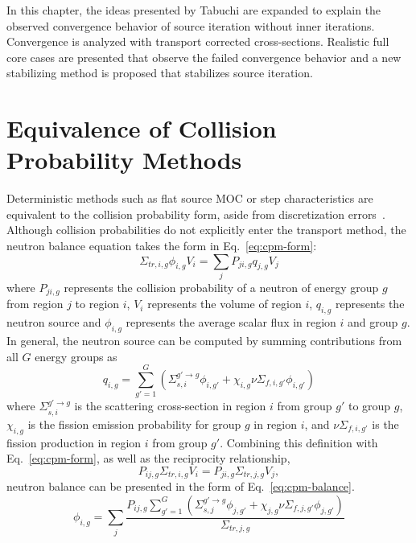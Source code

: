 In this chapter, the ideas presented by Tabuchi are expanded to explain the observed convergence behavior of source iteration without inner iterations. Convergence is analyzed with transport corrected cross-sections. Realistic full core cases are presented that observe the failed convergence behavior and a new stabilizing method is proposed that stabilizes source iteration.

\section{Equivalence of Collision Probability Methods}
\label{sec:equiv-cpm}

Deterministic methods such as flat source \ac{MOC} or step characteristics are equivalent to the collision probability form, aside from discretization errors~\cite{ty-problem}. Although collision probabilities do not explicitly enter the transport method, the neutron balance equation takes the form in Eq.~\ref{eq:cpm-form}:
\begin{equation}
	\Sigma_{\textit{tr}, i, g} \phi_{i,g} V_i = \sum_j P_{ji, g} q_{j,g} V_j
	\label{eq:cpm-form}
\end{equation}
where $P_{ji,g}$ represents the collision probability of a neutron of energy group $g$ from region $j$ to region $i$, $V_i$ represents the volume of region $i$, $q_{i,g}$ represents the neutron source and $\phi_{i,g}$ represents the average scalar flux in region $i$ and group $g$. In general, the neutron source can be computed by summing contributions from all $G$ energy groups as
\begin{equation}
	q_{i,g} = \sum_{g'=1}^G \left( \Sigma_{s,i}^{g'\rightarrow g} \phi_{i,g'} + \chi_{i,g} \nu \Sigma_{f,i,g'} \phi_{i,g'} \right)
\end{equation}
where $\Sigma_{s,i}^{g'\rightarrow g}$ is the scattering cross-section in region $i$ from group $g'$ to group $g$, $\chi_{i,g}$ is the fission emission probability for group $g$ in region $i$, and $\nu \Sigma_{f,i,g'}$ is the fission production in region $i$ from group $g'$. Combining this definition with Eq.~\ref{eq:cpm-form}, as well as the reciprocity relationship, 
\begin{equation}
	P_{ij, g} \Sigma_{\textit{tr}, i, g} V_i = P_{ji, g} \Sigma_{\textit{tr}, j, g} V_j,
	\label{eq:reciprocity}
\end{equation}
neutron balance can be presented in the form of Eq.~\ref{eq:cpm-balance}.
\begin{equation}
	\phi_{i,g} = \sum_j \frac{P_{ij, g} \sum_{g'=1}^G \left( \Sigma_{s,j}^{g'\rightarrow g} \phi_{j,g'} + \chi_{j,g} \nu \Sigma_{f,j,g'} \phi_{j,g'} \right)}{\Sigma_{\textit{tr}, j, g}} 
	\label{eq:cpm-balance}
\end{equation}
